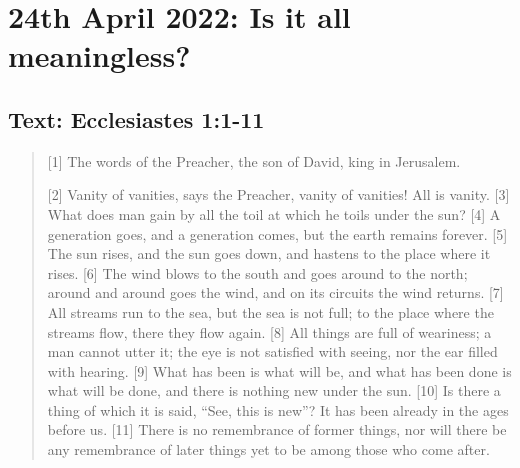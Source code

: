 \section{24th April 2022: Is it all meaningless?}
\subsection*{Text: Ecclesiastes 1:1-11}
  \begin{quote}
    [1] The words of the Preacher, the son of David, king in Jerusalem.

    [2] Vanity of vanities, says the Preacher,
        vanity of vanities! All is vanity.
    [3] What does man gain by all the toil
        at which he toils under the sun?
    [4] A generation goes, and a generation comes,
        but the earth remains forever.
    [5] The sun rises, and the sun goes down,
        and hastens to the place where it rises.
    [6] The wind blows to the south
        and goes around to the north;
    around and around goes the wind,
        and on its circuits the wind returns.
    [7] All streams run to the sea,
        but the sea is not full;
    to the place where the streams flow,
        there they flow again.
    [8] All things are full of weariness;
        a man cannot utter it;
    the eye is not satisfied with seeing,
        nor the ear filled with hearing.
    [9] What has been is what will be,
        and what has been done is what will be done,
        and there is nothing new under the sun.
    [10] Is there a thing of which it is said,
        “See, this is new”?
    It has been already
        in the ages before us.
    [11] There is no remembrance of former things,
        nor will there be any remembrance
    of later things yet to be
        among those who come after.
  \end{quote}
